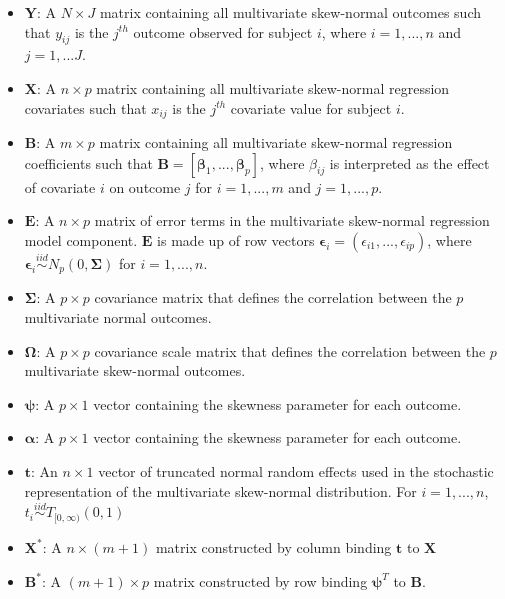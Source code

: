 \documentclass[useAMS,referee]{biom}
\begin{document}
\begin{itemize}

    \item $\mathbf{Y}$: A $N \times J$ matrix containing all multivariate skew-normal  outcomes such that $y_{ij}$ is the $j^{th}$ outcome observed for subject $i$, where $i = 1,...,n$ and $j = 1,...J$.
    
    \item $\mathbf{X}$: A $n \times p$ matrix containing all multivariate skew-normal regression covariates such that $x_{ij}$ is the $j^{th}$ covariate value for subject $i$.
    
    \item $\mathbf{B}$: A $m \times p$ matrix containing all multivariate skew-normal regression coefficients such that $\mathbf{B} = \left [ \boldsymbol\beta_1,...,\boldsymbol\beta_p \right ]$, where $\beta_{ij}$ is interpreted as the effect of covariate $i$ on outcome $j$ for $i = 1,...,m$ and $j = 1,...,p$.
    
    \item $\mathbf{E}$: A $n \times p$ matrix of error terms in the multivariate skew-normal regression model component. $\mathbf{E}$ is made up of row vectors $\boldsymbol\epsilon_i = (\epsilon_{i1},...,\epsilon_{ip})$, where $ \boldsymbol\epsilon_i \stackrel{iid}{\sim} N_p(0, \boldsymbol\Sigma)$ for $i = 1,...,n$.
    
    \item $\boldsymbol\Sigma$: A $p \times p$ covariance matrix that defines the correlation between the $p$ multivariate normal outcomes. 
    
    \item $\boldsymbol\Omega$: A $p \times p$ covariance scale matrix that defines the correlation between the $p$ multivariate skew-normal outcomes. 
    
    \item $\boldsymbol\psi$: A $p \times 1$ vector containing the skewness parameter for each outcome.
    
    \item $\boldsymbol\alpha$: A $p \times 1$ vector containing the skewness parameter for each outcome.
    
    \item $\mathbf{t}$: An $n \times 1$ vector of truncated normal random effects used in the stochastic representation of the multivariate skew-normal distribution. For $i = 1,...,n$, $t_i \stackrel{iid}{\sim}T_{[0,\infty)}(0,1)$
    
    \item $\mathbf{X}^*$: A $n \times (m + 1)$ matrix constructed by column binding $\mathbf{t}$ to $\mathbf{X}$
    
    \item $\mathbf{B}^*$: A $(m+1) \times p$ matrix constructed by row binding $\boldsymbol\psi^T$ to $\mathbf{B}$.

\end{itemize}
\end{document}
